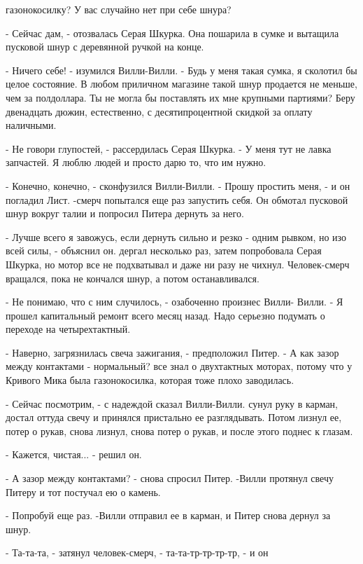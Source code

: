газонокосилку? У вас случайно нет при себе шнура?
\par- Сейчас дам, - отозвалась Серая Шкурка. Она пошарила в сумке и 
вытащила пусковой шнур с деревянной ручкой на конце.
\par- Ничего себе! - изумился Вилли-Вилли. - Будь у меня такая сумка, 
я сколотил бы целое состояние. В любом приличном магазине такой шнур 
продается не меньше, чем за полдоллара. Ты не могла бы поставлять их 
мне крупными партиями? Беру двенадцать дюжин, естественно, с 
десятипроцентной скидкой за оплату наличными.
\par- Не говори глупостей, - рассердилась Серая Шкурка. - У меня тут 
не лавка запчастей. Я люблю людей и просто дарю то, что им нужно.
\par- Конечно, конечно, - сконфузился Вилли-Вилли. - Прошу простить 
меня, - и он погладил Лист.
-смерч попытался еще раз запустить себя. Он обмотал 
пусковой шнур вокруг талии и попросил Питера дернуть за него.
\par- Лучше всего я завожусь, если дернуть сильно и резко - одним 
рывком, но изо всей силы, - объяснил он.
 дергал несколько раз, затем попробовала Серая Шкурка, но 
мотор все не подхватывал и даже ни разу не чихнул. Человек-смерч 
вращался, пока не кончался шнур, а потом останавливался.
\par- Не понимаю, что с ним случилось, - озабоченно произнес Вилли-
Вилли. - Я прошел капитальный ремонт всего месяц назад. Надо серьезно 
подумать о переходе на четырехтактный.
\par- Наверно, загрязнилась свеча зажигания, - предположил Питер. - А 
как зазор между контактами - нормальный?
 все знал о двухтактных моторах, потому что у Кривого Мика была 
газонокосилка, которая тоже плохо заводилась.
\par- Сейчас посмотрим, - с надеждой сказал Вилли-Вилли.
 сунул руку в карман, достал оттуда свечу и принялся пристально 
ее разглядывать. Потом лизнул ее, потер о рукав, снова лизнул, снова 
потер о рукав, и после этого поднес к глазам.
\par- Кажется, чистая... - решил он.
\par- А зазор между контактами? - снова спросил Питер.
-Вилли протянул свечу Питеру и тот постучал ею о камень.
\par- Попробуй еще раз.
-Вилли отправил ее в карман, и Питер снова дернул за шнур.
\par- Та-та-та, - затянул человек-смерч, - та-та-тр-тр-тр-тр, - и он 
